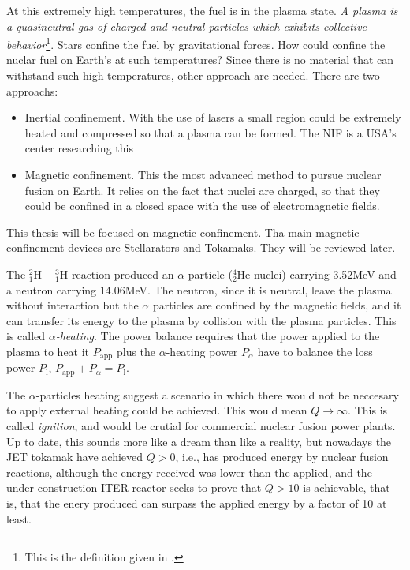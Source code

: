 \documentclass[a4paper,12pt,oneside]{book}
\begin{document}
At this extremely high temperatures, the fuel is in the plasma state. \textit{A plasma is a quasineutral gas of charged and neutral particles which exhibits
collective behavior}\footnote{This is the definition given in \cite{Chen}.}. Stars confine the fuel by gravitational forces. How could confine the nuclar fuel on Earth's at such temperatures? Since there is no material that can withstand such high temperatures, other approach are needed. There are two approachs:

\begin{itemize}
\item Inertial confinement. With the use of lasers a small region could be extremely heated and compressed so that a plasma can be formed. The NIF is a USA's center researching this
\item Magnetic confinement. This the most advanced method to pursue nuclear fusion on Earth. It relies on the fact that nuclei are charged, so that they could be confined in a closed space with the use of electromagnetic fields.
\end{itemize}
This thesis will be focused on magnetic confinement. Tha main magnetic confinement devices are Stellarators and Tokamaks. They will be reviewed later.

The ${}_1^2 \text{H}-{}_1^3 \text{H}$ reaction produced an $\alpha$ particle ($^4_2 \text{He}$ nuclei) carrying 3.52MeV and a neutron carrying 14.06MeV. The neutron, since it is neutral, leave the plasma without interaction but the $\alpha$ particles are confined by the magnetic fields, and it can transfer its energy to the plasma by collision with the plasma particles. This is called \textit{$\alpha$-heating}. The power balance requires that the power applied to the plasma to heat it $P_\text{app}$ plus the $\alpha$-heating power $P_\alpha$ have to balance the loss power $P_\text{l}$, $P_\text{app}+P_\alpha=P_\text{l}$. 

The $\alpha$-particles heating suggest a scenario in which there would not be neccesary to apply external heating could be achieved. This would mean $Q \rightarrow \infty$. This is called \textit{ignition}, and would be crutial for commercial nuclear fusion power plants. Up to date, this sounds more like a dream than like a reality, but nowadays the JET tokamak have achieved $Q>0$, i.e., has produced energy by nuclear fusion reactions, although the energy received was lower than the applied, and the under-construction ITER reactor seeks to prove that $Q>10$ is achievable, that is, that the enery produced can surpass the applied energy by a factor of 10 at least.
\end{document}

